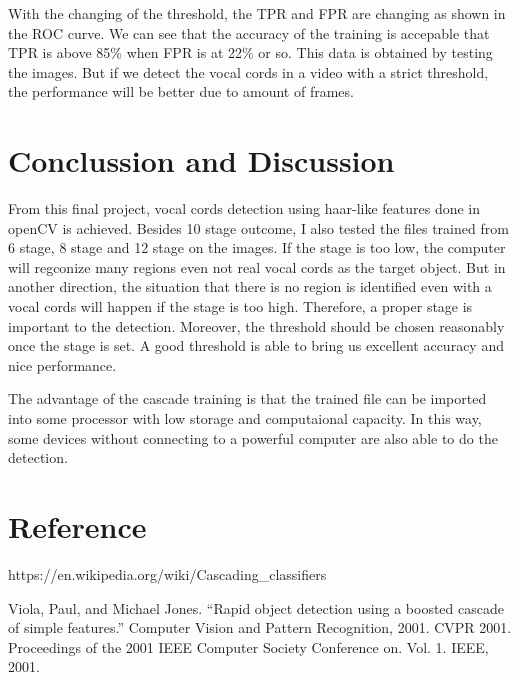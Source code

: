 \documentclass[11pt]{article}
\begin{document}
With the changing of the threshold, the TPR and FPR are changing as
shown in the ROC curve. We can see that the accuracy of the training is
accepable that TPR is above 85\% when FPR is at 22\% or so. This data is
obtained by testing the images. But if we detect the vocal cords in a
video with a strict threshold, the performance will be better due to
amount of frames.

    \hypertarget{conclussion-and-discussion}{%
\section{Conclussion and Discussion}\label{conclussion-and-discussion}}

    From this final project, vocal cords detection using haar-like features
done in openCV is achieved. Besides 10 stage outcome, I also tested the
files trained from 6 stage, 8 stage and 12 stage on the images. If the
stage is too low, the computer will regconize many regions even not real
vocal cords as the target object. But in another direction, the
situation that there is no region is identified even with a vocal cords
will happen if the stage is too high. Therefore, a proper stage is
important to the detection. Moreover, the threshold should be chosen
reasonably once the stage is set. A good threshold is able to bring us
excellent accuracy and nice performance.

The advantage of the cascade training is that the trained file can be
imported into some processor with low storage and computaional capacity.
In this way, some devices without connecting to a powerful computer are
also able to do the detection.

    \hypertarget{reference}{%
\section{Reference}\label{reference}}

    https://en.wikipedia.org/wiki/Cascading\_classifiers

Viola, Paul, and Michael Jones. ``Rapid object detection using a boosted
cascade of simple features.'' Computer Vision and Pattern Recognition,
2001. CVPR 2001. Proceedings of the 2001 IEEE Computer Society
Conference on. Vol. 1. IEEE, 2001.


    
    
    
    
\end{document}
